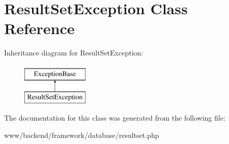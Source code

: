 \hypertarget{classResultSetException}{
\section{ResultSetException Class Reference}
\label{classResultSetException}
}
Inheritance diagram for ResultSetException:\begin{figure}[H]
\begin{center}
\leavevmode
\includegraphics[height=2.000000cm]{classResultSetException}
\end{center}
\end{figure}


The documentation for this class was generated from the following file:\begin{DoxyCompactItemize}
\item 
www/backend/framework/database/resultset.php\end{DoxyCompactItemize}
